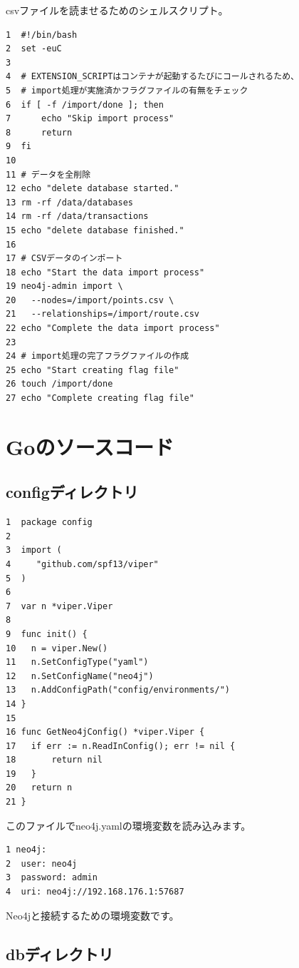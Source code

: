 csvファイルを読ませるためのシェルスクリプト。
\begin{tcolorbox}[title=import\_data.sh]
\begin{verbatim}
1  #!/bin/bash
2  set -euC
3
4  # EXTENSION_SCRIPTはコンテナが起動するたびにコールされるため、
5  # import処理が実施済かフラグファイルの有無をチェック
6  if [ -f /import/done ]; then
7      echo "Skip import process"
8      return
9  fi
10
11 # データを全削除
12 echo "delete database started."
13 rm -rf /data/databases
14 rm -rf /data/transactions
15 echo "delete database finished."
16
17 # CSVデータのインポート
18 echo "Start the data import process"
19 neo4j-admin import \
20   --nodes=/import/points.csv \
21   --relationships=/import/route.csv
22 echo "Complete the data import process"
23
24 # import処理の完了フラグファイルの作成
25 echo "Start creating flag file"
26 touch /import/done
27 echo "Complete creating flag file"
\end{verbatim}
\end{tcolorbox}
    
\section{Goのソースコード}
\subsection{configディレクトリ}

\begin{tcolorbox}[title=config.go]
\begin{verbatim}
1  package config
2
3  import (
4  	  "github.com/spf13/viper"
5  )
6
7  var n *viper.Viper
8
9  func init() {
10 	 n = viper.New()
11	 n.SetConfigType("yaml")
12 	 n.SetConfigName("neo4j")
13 	 n.AddConfigPath("config/environments/")
14 }
15
16 func GetNeo4jConfig() *viper.Viper {
17	 if err := n.ReadInConfig(); err != nil {
18		 return nil
19	 }
20	 return n
21 }
\end{verbatim}
\end{tcolorbox}
このファイルでneo4j.yamlの環境変数を読み込みます。
\begin{tcolorbox}[title=neo4j.yml]
\begin{verbatim}
1 neo4j:
2  user: neo4j
3  password: admin
4  uri: neo4j://192.168.176.1:57687
\end{verbatim}
\end{tcolorbox}
Neo4jと接続するための環境変数です。

\subsection{dbディレクトリ}






